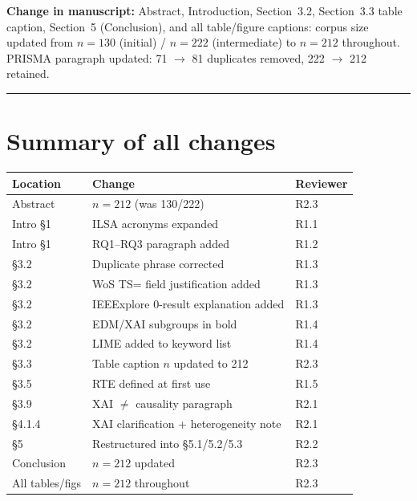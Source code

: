 \documentclass[12pt,a4paper]{article}
\newcommand{\change}[1]{\textbf{Change in manuscript:} #1}
\begin{document}
\change{Abstract, Introduction, Section~3.2, Section~3.3 table caption, Section~5 (Conclusion), and all table/figure captions: corpus size updated from $n = 130$ (initial) / $n = 222$ (intermediate) to $n = 212$ throughout. PRISMA paragraph updated: 71 $\to$ 81 duplicates removed, 222 $\to$ 212 retained.}

\bigskip
\hrule
\bigskip

\section*{Summary of all changes}

\begin{tabular}{p{1.5cm} p{5.5cm} p{6cm}}
\toprule
Location & Change & Reviewer \\
\midrule
Abstract & $n = 212$ (was 130/222) & R2.3 \\
Intro \S1 & ILSA acronyms expanded & R1.1 \\
Intro \S1 & RQ1--RQ3 paragraph added & R1.2 \\
\S3.2 & Duplicate phrase corrected & R1.3 \\
\S3.2 & WoS TS= field justification added & R1.3 \\
\S3.2 & IEEExplore 0-result explanation added & R1.3 \\
\S3.2 & EDM/XAI subgroups in bold & R1.4 \\
\S3.2 & LIME added to keyword list & R1.4 \\
\S3.3 & Table caption $n$ updated to 212 & R2.3 \\
\S3.5 & RTE defined at first use & R1.5 \\
\S3.9 & XAI $\neq$ causality paragraph & R2.1 \\
\S4.1.4 & XAI clarification + heterogeneity note & R2.1 \\
\S5 & Restructured into \S5.1/5.2/5.3 & R2.2 \\
Conclusion & $n = 212$ updated & R2.3 \\
All tables/figs & $n = 212$ throughout & R2.3 \\
\bottomrule
\end{tabular}
\end{document}
